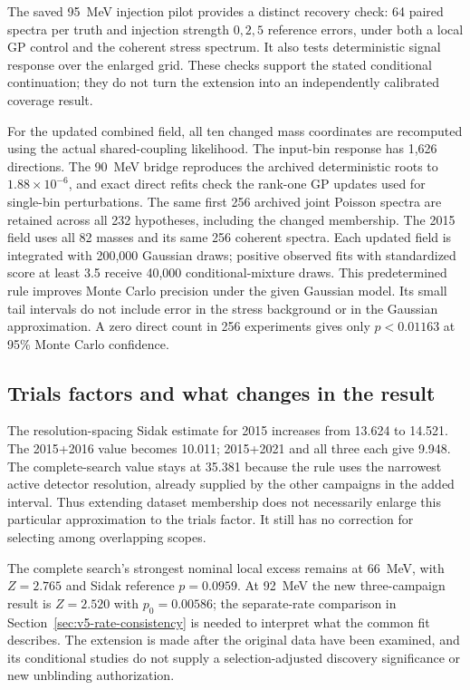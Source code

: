 The saved 95~MeV injection pilot provides a distinct recovery check: 64
paired spectra per truth and injection strength $0,2,5$ reference errors,
under both a local GP control and the coherent stress spectrum. It also
tests deterministic signal response over the enlarged grid. These checks
support the stated conditional continuation; they do not turn the extension
into an independently calibrated coverage result.

For the updated combined field, all ten changed mass coordinates are
recomputed using the actual shared-coupling likelihood. The input-bin
response has 1,626 directions. The 90~MeV bridge reproduces the archived
deterministic roots to $1.88\times10^{-6}$, and exact direct refits check
the rank-one GP updates used for single-bin perturbations. The same first
256 archived joint Poisson spectra are retained across all 232 hypotheses,
including the changed membership. The 2015 field uses all 82 masses and
its same 256 coherent spectra. Each updated field is integrated with
200,000 Gaussian draws; positive observed fits with standardized score
at least 3.5 receive 40,000 conditional-mixture draws. This predetermined
rule improves Monte Carlo precision under the given Gaussian model. Its
small tail intervals do not include error in the stress background or in
the Gaussian approximation. A zero direct count in 256 experiments gives
only $p<0.01163$ at 95\% Monte Carlo confidence.

\subsection{Trials factors and what changes in the result}
The resolution-spacing Sidak estimate for 2015 increases from 13.624 to
14.521. The 2015+2016 value becomes 10.011; 2015+2021 and all three each
give 9.948. The complete-search value stays at 35.381 because the rule
uses the narrowest active detector resolution, already supplied by the
other campaigns in the added interval. Thus extending dataset membership
does not necessarily enlarge this particular approximation to the trials
factor. It still has no correction for selecting among overlapping scopes.

The complete search's strongest nominal local excess remains at 66~MeV,
with $Z=2.765$ and Sidak reference $p=0.0959$. At 92~MeV the new
three-campaign result is $Z=2.520$ with $p_0=0.00586$; the separate-rate
comparison in Section~\ref{sec:v5-rate-consistency} is needed to interpret
what the common fit describes. The extension is made after the original
data have been examined, and its conditional studies do not supply a
selection-adjusted discovery significance or new unblinding authorization.
